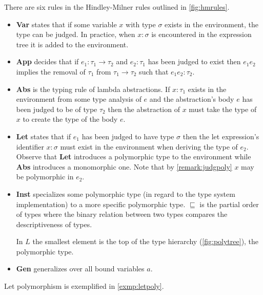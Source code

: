 \documentclass[11pt,oneside,a4paper]{report}
\begin{document}
There are six rules in the Hindley-Milner rules outlined in \autoref{fig:hmrules}.
\begin{itemize}
    \item \textbf{Var} states that if some variable $x$ with type $\sigma$ exists in the environment, the type can be judged.
        In practice, when $x: \sigma$ is encountered in the expression tree it is added to the environment.
    \item \textbf{App} decides that if $e_1 : \tau_1 \rightarrow \tau_2$ and $e_2 : \tau_1$ has been judged to exist then $e_1 e_2$ implies the removal of $\tau_1$ from $\tau_1 \rightarrow \tau_2$ such that $e_1 e_2: \tau_2$.
    \item \textbf{Abs} is the typing rule of lambda abstractions.
        If $x : \tau_1$ exists in the environment from some type analysis of $e$ and the abstraction's body $e$ has been judged to be of type $\tau_2$ then the abstraction of $x$ must take the type of $x$ to create the type of the body $e$.
    \item \textbf{Let} states that if $e_1$ has been judged to have type $\sigma$ then the let expression's identifier $x: \sigma$ must exist in the environment when deriving the type of $e_2$.
        Observe that \textbf{Let} introduces a polymorphic type to the environment while \textbf{Abs} introduces a monomorphic one.
        Note that by \autoref{remark:judgpoly} $x$ may be polymorphic in $e_2$.
    \item \textbf{Inst} specializes some polymorphic type (in regard to the type system implementation) to a more specific polymorphic type.
        $\sqsubseteq$ is the partial order of types where the binary relation between two types compares the descriptiveness of types.
        \begin{exmp}
            In $L$ the smallest element is the top of the type hierarchy (\autoref{fig:polytree}), the polymorphic type.
        \end{exmp}
    \item \textbf{Gen} generalizes over all bound variables $a$.
\end{itemize}
Let polymorphism is exemplified in \autoref{exmp:letpoly}.
\end{document}
